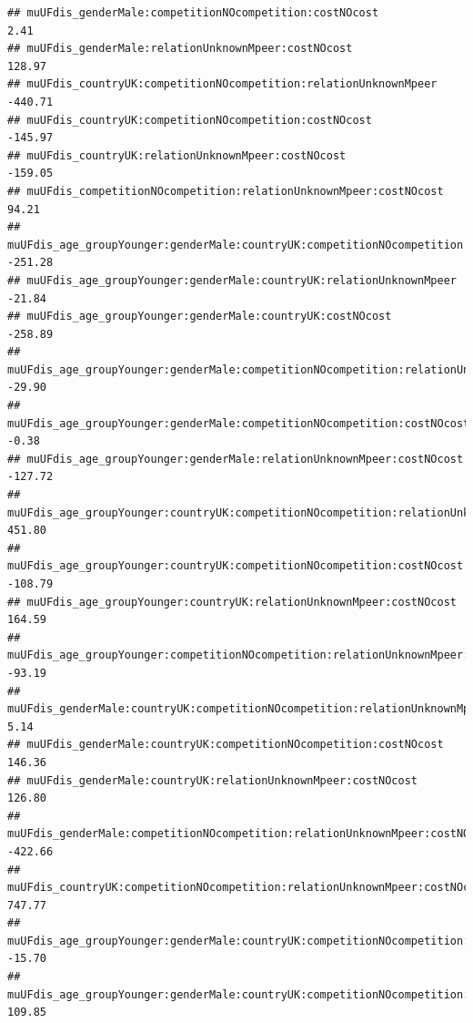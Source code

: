 \documentclass[
]{article}
\begin{document}
\begin{verbatim}
## muUFdis_genderMale:competitionNOcompetition:costNOcost                                                     2.41
## muUFdis_genderMale:relationUnknownMpeer:costNOcost                                                       128.97
## muUFdis_countryUK:competitionNOcompetition:relationUnknownMpeer                                         -440.71
## muUFdis_countryUK:competitionNOcompetition:costNOcost                                                   -145.97
## muUFdis_countryUK:relationUnknownMpeer:costNOcost                                                       -159.05
## muUFdis_competitionNOcompetition:relationUnknownMpeer:costNOcost                                          94.21
## muUFdis_age_groupYounger:genderMale:countryUK:competitionNOcompetition                                  -251.28
## muUFdis_age_groupYounger:genderMale:countryUK:relationUnknownMpeer                                       -21.84
## muUFdis_age_groupYounger:genderMale:countryUK:costNOcost                                                -258.89
## muUFdis_age_groupYounger:genderMale:competitionNOcompetition:relationUnknownMpeer                        -29.90
## muUFdis_age_groupYounger:genderMale:competitionNOcompetition:costNOcost                                   -0.38
## muUFdis_age_groupYounger:genderMale:relationUnknownMpeer:costNOcost                                     -127.72
## muUFdis_age_groupYounger:countryUK:competitionNOcompetition:relationUnknownMpeer                         451.80
## muUFdis_age_groupYounger:countryUK:competitionNOcompetition:costNOcost                                  -108.79
## muUFdis_age_groupYounger:countryUK:relationUnknownMpeer:costNOcost                                       164.59
## muUFdis_age_groupYounger:competitionNOcompetition:relationUnknownMpeer:costNOcost                        -93.19
## muUFdis_genderMale:countryUK:competitionNOcompetition:relationUnknownMpeer                                 5.14
## muUFdis_genderMale:countryUK:competitionNOcompetition:costNOcost                                         146.36
## muUFdis_genderMale:countryUK:relationUnknownMpeer:costNOcost                                             126.80
## muUFdis_genderMale:competitionNOcompetition:relationUnknownMpeer:costNOcost                             -422.66
## muUFdis_countryUK:competitionNOcompetition:relationUnknownMpeer:costNOcost                               747.77
## muUFdis_age_groupYounger:genderMale:countryUK:competitionNOcompetition:relationUnknownMpeer              -15.70
## muUFdis_age_groupYounger:genderMale:countryUK:competitionNOcompetition:costNOcost                        109.85

\end{verbatim}
\end{document}
